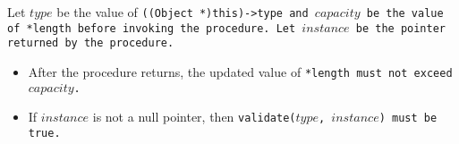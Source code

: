 Let $type$ be the value of \tt{((Object *)this)->type}
and $capacity$ be the value of \tt{*length} before invoking the procedure.
Let $instance$ be the pointer returned by the procedure.

\begin{itemize}[nosep]

\item After the procedure returns, the updated
value of \tt{*length} must not exceed $capacity$.

\item If $instance$ is not a null pointer, then
\tt{validate(}$type$\tt{,} $instance$\tt{)} must be \tt{true}.

\end{itemize}
